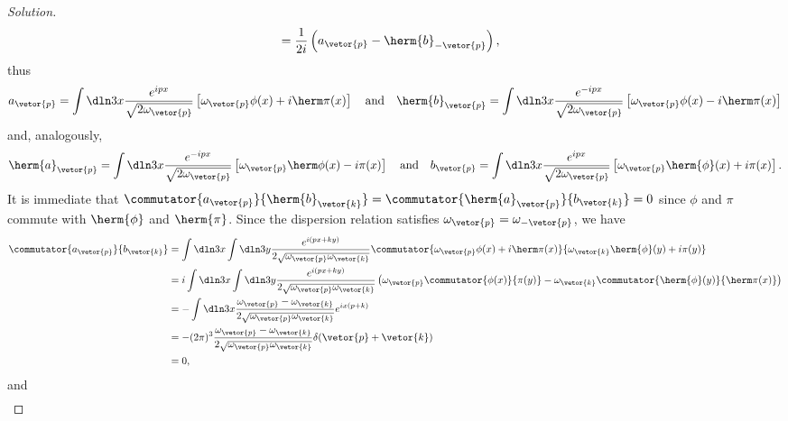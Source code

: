 \begin{proof}[Solution]
\begin{align*}
                                                     &= \frac{1}{2i} \left(a_{\vetor{p}} - \herm{b}_{-\vetor{p}} \right),
   \end{align*}
   thus
   \begin{equation*}
      a_{\vetor{p}} = \int\dln3x \frac{e^{ipx}}{\sqrt{2\omega_{\vetor{p}}}} \left[\omega_{\vetor{p}} \phi(x) + i \herm\pi(x)\right]
      \quad\text{and}\quad
      \herm{b}_{\vetor{p}} = \int\dln3x \frac{e^{-ipx}}{\sqrt{2\omega_{\vetor{p}}}} \left[\omega_{\vetor{p}} \phi(x) - i \herm\pi(x)\right]
   \end{equation*}
   and, analogously, 
   \begin{equation*}
      \herm{a}_{\vetor{p}} = \int\dln3x \frac{e^{-ipx}}{\sqrt{2\omega_{\vetor{p}}}} \left[\omega_{\vetor{p}} \herm\phi(x) - i \pi(x)\right]
      \quad\text{and}\quad
      b_{\vetor{p}} = \int\dln3x \frac{e^{ipx}}{\sqrt{2\omega_{\vetor{p}}}} \left[\omega_{\vetor{p}} \herm{\phi}(x) + i {\pi}(x)\right].
   \end{equation*}
   It is immediate that \(\commutator{a_{\vetor{p}}}{\herm{b}_{\vetor{k}}} = \commutator{\herm{a}_{\vetor{p}}}{b_{\vetor{k}}} = 0\) since \(\phi\) and \(\pi\) commute with \(\herm{\phi}\) and \(\herm{\pi}\). Since the dispersion relation satisfies \(\omega_{\vetor{p}} = \omega_{-\vetor{p}}\), we have
   \begin{align*}
      \commutator{a_{\vetor{p}}}{b_{\vetor{k}}} &= \int \dln3{x} \int \dln3{y} \frac{e^{i(px + k y)}}{2\sqrt{\omega_{\vetor{p}}\omega_{\vetor{k}}}} \commutator{\omega_{\vetor{p}} \phi(x) + i \herm\pi(x)}{\omega_{\vetor{k}} \herm{\phi}(y) + i \pi(y)}\\
                                                &= i\int \dln3x \int \dln3{y} \frac{e^{i(px + k y)}}{2 \sqrt{\omega_{\vetor{p}} \omega_{\vetor{k}}}} \left(\omega_{\vetor{p}}\commutator{\phi(x)}{\pi(y)} - \omega_{\vetor{k}} \commutator{\herm{\phi}(y)}{\herm\pi(x)} \right)\\
                                                &= - \int \dln3x \frac{\omega_{\vetor{p}} - \omega_{\vetor{k}}}{2 \sqrt{\omega_{\vetor{p}} \omega_{\vetor{k}}}} e^{ix(p + k)}\\
                                                &= -(2\pi)^3 \frac{\omega_{\vetor{p}} - \omega_{\vetor{k}}}{2\sqrt{\omega_{\vetor{p}} \omega_{\vetor{k}}}} \delta(\vetor{p} + \vetor{k})\\
                                                &= 0,
   \end{align*}
   and
   \begin{align*}

\end{align*}
\end{proof}
